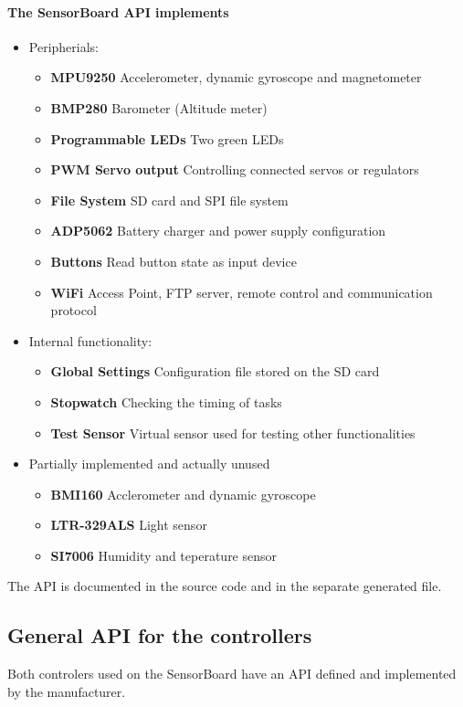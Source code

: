 \paragraph{The SensorBoard API implements}
\begin{itemize}
	\item Peripherials:
	\begin{itemize}
		\item \textbf{MPU9250} Accelerometer, dynamic gyroscope and magnetometer
		\item \textbf{BMP280} Barometer (Altitude meter)
		\item \textbf{Programmable LEDs} Two green LEDs
		\item \textbf{PWM Servo output} Controlling connected servos or regulators
		\item \textbf{File System} SD card and SPI file system
		\item \textbf{ADP5062} Battery charger and power supply configuration
		\item \textbf{Buttons} Read button state as input device
		\item \textbf{WiFi} Access Point, FTP server, remote control and communication protocol
	\end{itemize}
	\item Internal functionality:
	\begin{itemize}
		\item \textbf{Global Settings} Configuration file stored on the SD card
		\item \textbf{Stopwatch} Checking the timing of tasks
		\item \textbf{Test Sensor} Virtual sensor used for testing other functionalities
	\end{itemize}
	\item Partially implemented and actually unused
	\begin{itemize}
		\item \textbf{BMI160} Acclerometer and dynamic gyroscope
		\item \textbf{LTR-329ALS} Light sensor
		\item \textbf{SI7006} Humidity and teperature sensor
	\end{itemize}
\end{itemize}

The API is documented in the source code and in the separate generated file.

\subsection{General API for the controllers}
\label{GeneralAPI}
Both controlers used on the SensorBoard have an API defined and implemented by the manufacturer.


